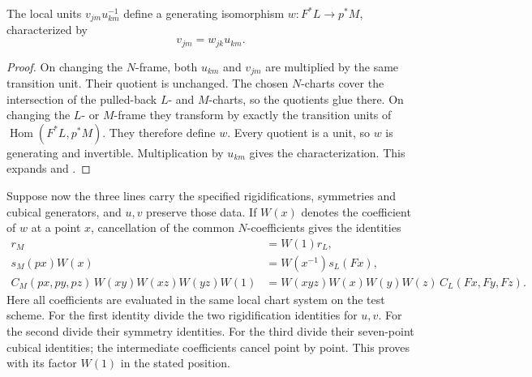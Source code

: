\begin{srlemma}
\label{lem:preunif-quotient-coefficient}
The local units \(v_{jm}u_{km}^{-1}\) define a generating isomorphism
\(w:F^*L\to p^*M\), characterized by
\[
                      v_{jm}=w_{jk}u_{km}.
 \tag{PUF4}\label{eq:preunif-quotient-coefficient}
\]
\end{srlemma}
\begin{proof}
On changing the \(N\)-frame, both \(u_{km}\) and \(v_{jm}\)
are multiplied by the same transition unit.
Their quotient is unchanged.  The chosen \(N\)-charts cover the
intersection of the pulled-back \(L\)- and \(M\)-charts, so the
quotients glue there.  On changing the \(L\)- or \(M\)-frame they
transform by exactly the transition units of
\(\operatorname{Hom}(F^*L,p^*M)\).
They therefore define \(w\).  Every quotient is a unit, so \(w\)
is generating and invertible.
Multiplication by \(u_{km}\) gives the characterization.
This expands  and
.
\end{proof}

Suppose now the three lines carry the specified rigidifications,
symmetries and cubical generators, and \(u,v\) preserve those data.
If \(W(x)\) denotes the coefficient of \(w\) at a point \(x\),
cancellation of the common \(N\)-coefficients gives the identities
\[
 \begin{aligned}
 r_M&=W(1)r_L,\\
 s_M(px)W(x)&=W(x^{-1})s_L(Fx),\\
 C_M(px,py,pz)\,W(xy)W(xz)W(yz)W(1)
   &=W(xyz)W(x)W(y)W(z)\,C_L(Fx,Fy,Fz).
 \end{aligned}
 \tag{PUF5}\label{eq:preunif-quotient-cube}
\]
Here all coefficients are evaluated in the same local chart system
on the test scheme.  For the first identity divide the two
rigidification identities for \(u,v\).  For the second divide their
symmetry identities.  For the third divide their seven-point
cubical identities; the intermediate coefficients cancel
point by point.  This proves  with its factor
\(W(1)\) in the stated position.


